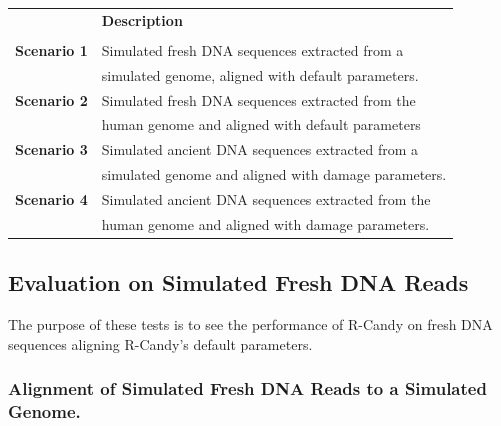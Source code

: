 \documentclass[11pt,a4paper]{report}
\begin{document}
\begin{table}[H]
  \begin{tabular}{ | c| p{9cm}  |}
    \hline
 		                           &  \textbf{Description} \\
 		                           &						\\ \hline
       \textbf{  Scenario 1 }  &  Simulated fresh DNA sequences extracted from a  \\
                               &  simulated genome, aligned with default parameters. \\ \hline
       \textbf{  Scenario 2 }  &  Simulated fresh DNA sequences extracted from the \\
                               &  human genome and aligned with default parameters \\  \hline
       \textbf{  Scenario 3 }  &  Simulated ancient DNA sequences extracted from a  \\
                               &  simulated genome and aligned with damage parameters. \\  \hline
       \textbf{  Scenario 4 }  &  Simulated ancient DNA sequences extracted from the  \\
                               &  human genome and aligned with damage parameters. \\  \hline
       
    \end{tabular}
\label{test-scenarios}
\end{table}




\subsection{Evaluation on Simulated Fresh DNA Reads } \label{Simulated Fresh DNA Reads }
 
 The purpose of these tests is to see the performance of R-Candy on 
 fresh DNA sequences aligning R-Candy's default parameters. 

 \subsubsection {Alignment of Simulated Fresh DNA Reads to a Simulated Genome.}
 \label {Alignment of Simulated Fresh DNA Reads to a Simulated Genome.}
 
\end{document}
